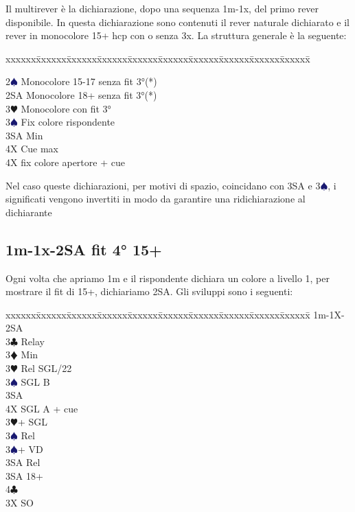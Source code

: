 \documentclass[a4paper,italian]{article}
\newcommand{\BC}{\textcolor{OliveGreen}{$\clubsuit$}}
\newcommand{\BD}{\textcolor{RedOrange}{$\vardiamondsuit$}}
\newcommand{\BH}{\textcolor{Red2}{$\varheartsuit${}}}
\newcommand{\BS}{\textcolor{MidnightBlue}{$\spadesuit${}}}
\newenvironment{bidtable}
{\begin{tabbing}

    xxxxxx\=xxxxxx\=xxxxxx\=xxxxxx\=xxxxxx\=xxxxxx\=xxxxxx\=xxxxxx\=xxxxxx\=xxxxxx\=\kill}
{\end{tabbing} }%
\newenvironment{attenzione}[1]
{\begin{tcolorbox}[colframe=red!80!white,title=#1]}
    {
\end{tcolorbox} }%
\begin{document}
Il multirever è la dichiarazione, dopo una sequenza 1m-1x, del primo rever disponibile. In questa dichiarazione sono contenuti il rever naturale dichiarato e il rever in monocolore 15+ hcp con o senza 3x. La struttura generale è la seguente:
\bigbreak
\begin{bidtable}

    2\BS \> Monocolore 15-17 senza fit 3°(*)\\
    2SA \> Monocolore 18+ senza fit 3°(*)\\
    3\BH \> Monocolore con fit 3°\+\\
    3\BS \> Fix colore rispondente\+\\
    3SA \> Min\\
    4X \> Cue max\-\\
    4X \> fix colore apertore + cue\-
\end{bidtable}
\bigbreak
\begin{attenzione}{ATTENZIONE(*)}
    Nel caso queste dichiarazioni, per motivi di spazio, coincidano con 3SA e 3\BS , i significati vengono invertiti in modo da garantire una ridichiarazione al dichiarante
\end{attenzione}
\newpage

\subsection{1m-1x-2SA fit 4° 15+}\label{2SAfit}

Ogni volta che apriamo 1m e il rispondente dichiara un colore a livello 1, per mostrare il fit di 15+, dichiariamo 2SA. Gli sviluppi sono i seguenti:
\bigbreak
\begin{bidtable}
    1m-1X-2SA\+\\
    3\BC \> Relay\+\\
    3\BD \> Min\+\\
    3\BH \> Rel SGL/22\+\\
    3\BS \> SGL B\\
    3SA \\
    4X \> SGL A + cue\-\-\\
    3\BH {}+ SGL\+\\
    3\BS \> Rel\-\\
    3\BS {}+ VD\+\\
    3SA \> Rel\-\\
    3SA  18+\\
    4\BC {}\-\\
    3X \> SO\-
\end{bidtable}
\end{document}
